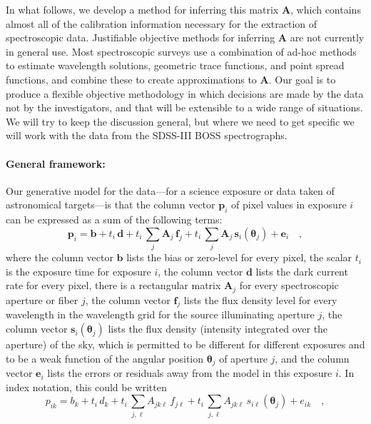 \documentclass[12pt]{article}
\newcommand{\hmatrix}[1]{\boldsymbol{#1}}
\newcommand{\Amatrix}{\hmatrix{A}}
\newcommand{\pixels}{\hmatrix{p}}
\newcommand{\bias}{\hmatrix{b}}
\newcommand{\dark}{\hmatrix{d}}
\newcommand{\flux}{\hmatrix{f}}
\newcommand{\sky}{\hmatrix{s}}
\renewcommand{\angle}{\hmatrix{\theta}}
\newcommand{\error}{\hmatrix{e}}
\newcommand{\exptime}{t}
\begin{document}
In what follows, we develop a method for inferring this matrix
$\Amatrix$, which contains almost all of the calibration information
necessary for the extraction of spectroscopic data.  Justifiable
objective methods for inferring $\Amatrix$ are not currently in
general use.  Most spectroscopic surveys use a combination of ad-hoc
methods to estimate wavelength solutions, geometric trace functions,
and point spread functions, and combine these to create approximations
to $\Amatrix$.  Our goal is to produce a flexible objective
methodology in which decisions are made by the data not by the
investigators, and that will be extensible to a wide range of
situations.  We will try to keep the discussion general, but where we
need to get specific we will work with the data from the SDSS-III BOSS
spectrographs.

\paragraph{General framework:}
Our generative model for the data---for a science exposure or data
taken of astronomical targets---is that the column vector $\pixels_i$
of pixel values in exposure $i$ can be expressed as a sum of the
following terms:
\begin{equation}
\pixels_i = \bias + \exptime_i\,\dark
          + \exptime_i\,\sum_j \Amatrix_j\,\flux_j
          + \exptime_i\,\sum_j \Amatrix_j\,\sky_i(\angle_j)
          + \error_i \quad ,
\end{equation}
where the column vector $\bias$ lists the bias or zero-level for every
pixel, the scalar $\exptime_i$ is the exposure time for exposure $i$,
the column vector $\dark$ lists the dark current rate for every pixel,
there is a rectangular matrix $\Amatrix_j$ for every spectroscopic
aperture or fiber $j$, the column vector $\flux_j$ lists the flux
density level for every wavelength in the wavelength grid for the
source illuminating aperture $j$, the column vector $\sky_i(\angle_j)$
lists the flux density (intensity integrated over the aperture) of the
sky, which is permitted to be different for different exposures and to
be a weak function of the angular position $\angle_j$ of aperture $j$,
and the column vector $\error_i$ lists the errors or residuals away
from the model in this exposure $i$.  In index notation, this could be
written
\begin{equation}
p_{ik} = b_k + \exptime_i\,d_k
       + \exptime_i\,\sum_{j,\ell} A_{jk\ell}\,f_{j\ell}
       + \exptime_i\,\sum_{j,\ell} A_{jk\ell}\,s_{i\ell}(\angle_j)
       + e_{ik} \quad ,
\end{equation}
\end{document}
